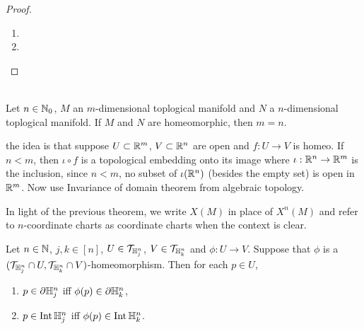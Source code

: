 \documentclass{book}
\begin{document}
	\begin{proof}\
		\begin{enumerate}
			\item 
			\item 
		\end{enumerate}
	\end{proof}

	\begin{thm}
	\end{thm}
	
	\begin{thm}  \\
		Let $n \in \mathbb{N}_0$, $M$ an $m$-dimensional toplogical manifold and $N$ a $n$-dimensional toplogical manifold. If $M$ and $N$ are homeomorphic, then $m = n$.
	\end{thm}

	the idea is that suppose $U \subset \mathbb{R}^m$, $V \subset \mathbb{R}^n$ are open and $f:U \rightarrow V$ is homeo. If $n < m$, then $\iota \circ f $ is a topological embedding onto its image where $\iota: \mathbb{R}^n \rightarrow \mathbb{R}^m$ is the inclusion, since $n < m$, no subset of $\iota(\mathbb{R}^n)$ (besides the empty set) is open in $\mathbb{R}^m$. Now use Invariance of domain theorem from algebraic topology.

	\begin{note}
		In light of the previous theorem, we write $X(M)$ in place of $X^n(M)$ and refer to $n$-coordinate charts as coordinate charts when the context is clear.
	\end{note}

	\begin{ex} 
		Let $n \in \mathbb{N}$, $j,k \in [n]$, $U \in \mathcal{T}_{\mathbb{H}^n_j}$, $V \in \mathcal{T}_{\mathbb{H}^n_k}$ and $\phi:U \rightarrow V$. Suppose that $\phi$ is a $(\mathcal{T}_{\mathbb{H}^n_j} \cap U, \mathcal{T}_{\mathbb{H}^n_k} \cap V)$-homeomorphism. Then for each $p \in U$, 
		\begin{enumerate}
			\item $p \in \partial \mathbb{H}^n_j$ iff $\phi(p) \in \partial \mathbb{H}^n_k$, 
			\item $p \in \operatorname{Int} \mathbb{H}^n_j$ iff $\phi(p) \in \operatorname{Int} \mathbb{H}^n_k$.
		\end{enumerate}
	\end{ex}
\end{document}

